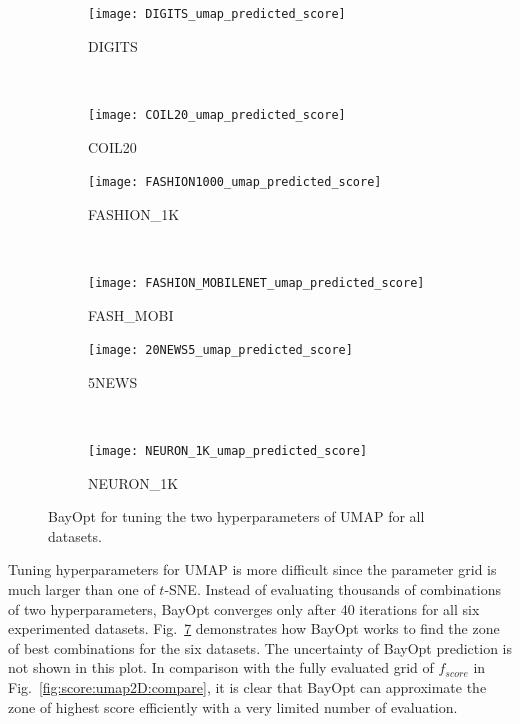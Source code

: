 \begin{figure}%
    \begin{subfigure}[b]{.48\linewidth}
        \centering
        \texttt{[image: DIGITS\_umap\_predicted\_score]}
        \caption{DIGITS}
        \label{fig:bo:umap:predict:DIGITS}
    \end{subfigure}
    ~
    \begin{subfigure}[b]{.48\linewidth}
        \centering
        \texttt{[image: COIL20\_umap\_predicted\_score]}
        \caption{COIL20}
        \label{fig:bo:umap:predict:COIL20}
    \end{subfigure}
    \vfill
    \begin{subfigure}[b]{.48\linewidth}
        \centering
        \texttt{[image: FASHION1000\_umap\_predicted\_score]}
        \caption{{FASHION\_1K}}
        \label{fig:bo:umap:predict:FASHION1K}
    \end{subfigure}
    ~
    \begin{subfigure}[b]{.48\linewidth}
        \centering
        \texttt{[image: FASHION\_MOBILENET\_umap\_predicted\_score]}
        \caption{{FASH\_MOBI}}
        \label{fig:bo:umap:predict:FASHMOBI}
    \end{subfigure}
    \vfill
    \begin{subfigure}[b]{.48\linewidth}
        \centering
        \texttt{[image: 20NEWS5\_umap\_predicted\_score]}
        \caption{5NEWS}
        \label{fig:bo:umap:predict:5NEWS}
    \end{subfigure}
    ~
    \begin{subfigure}[b]{.48\linewidth}
        \centering
        \texttt{[image: NEURON\_1K\_umap\_predicted\_score]}
        \caption{{NEURON\_1K}}
        \label{fig:bo:umap:predict:NEURON1K}
    \end{subfigure}
    \caption{BayOpt for tuning the two hyperparameters of UMAP for all datasets.}
    \label{fig:bo:umap:predict}
\end{figure}

Tuning hyperparameters for UMAP is more difficult since the parameter grid is much larger than one of $t$-SNE.
Instead of evaluating thousands of combinations of two hyperparameters, BayOpt converges only after 40 iterations for all six experimented datasets.
Fig.~\ref{fig:bo:umap:predict} demonstrates how BayOpt works to find the zone of best combinations for the six datasets.
The uncertainty of BayOpt prediction is not shown in this plot.
In comparison with the fully evaluated grid of $f_{score}$ in Fig.~\ref{fig:score:umap2D:compare},
it is clear that BayOpt can approximate the zone of highest score efficiently with a very limited number of evaluation.


